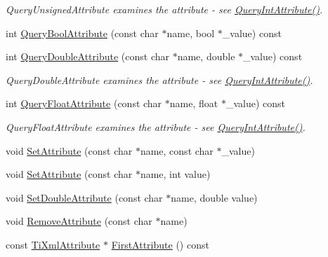 \begin{DoxyCompactItemize}
\begin{DoxyCompactList}\small\item\em \-Query\-Unsigned\-Attribute examines the attribute -\/ see \hyperlink{class_ti_xml_element_aea0bfe471380f281c5945770ddbf52b9}{\-Query\-Int\-Attribute()}. \end{DoxyCompactList}\item 
int \hyperlink{class_ti_xml_element_af4a1d3f88c28eb0f3115dc39ebd83fff}{\-Query\-Bool\-Attribute} (const char $\ast$name, bool $\ast$\-\_\-value) const 
\item 
\hypertarget{class_ti_xml_element_a898d7730ecc341f0bffc7a9dadbf1ce7}{int \hyperlink{class_ti_xml_element_a898d7730ecc341f0bffc7a9dadbf1ce7}{\-Query\-Double\-Attribute} (const char $\ast$name, double $\ast$\-\_\-value) const }\label{class_ti_xml_element_a898d7730ecc341f0bffc7a9dadbf1ce7}

\begin{DoxyCompactList}\small\item\em \-Query\-Double\-Attribute examines the attribute -\/ see \hyperlink{class_ti_xml_element_aea0bfe471380f281c5945770ddbf52b9}{\-Query\-Int\-Attribute()}. \end{DoxyCompactList}\item 
\hypertarget{class_ti_xml_element_aa04d3af11601ef5a5f88295203a843be}{int \hyperlink{class_ti_xml_element_aa04d3af11601ef5a5f88295203a843be}{\-Query\-Float\-Attribute} (const char $\ast$name, float $\ast$\-\_\-value) const }\label{class_ti_xml_element_aa04d3af11601ef5a5f88295203a843be}

\begin{DoxyCompactList}\small\item\em \-Query\-Float\-Attribute examines the attribute -\/ see \hyperlink{class_ti_xml_element_aea0bfe471380f281c5945770ddbf52b9}{\-Query\-Int\-Attribute()}. \end{DoxyCompactList}\item 
void \hyperlink{class_ti_xml_element_abf0b3bd7f0e4c746a89ec6e7f101fc32}{\-Set\-Attribute} (const char $\ast$name, const char $\ast$\-\_\-value)
\item 
void \hyperlink{class_ti_xml_element_ace6f4be75e373726d4774073d666d1a7}{\-Set\-Attribute} (const char $\ast$name, int value)
\item 
void \hyperlink{class_ti_xml_element_a0d1dd975d75496778177e35abfe0ec0b}{\-Set\-Double\-Attribute} (const char $\ast$name, double value)
\item 
void \hyperlink{class_ti_xml_element_a56979767deca794376b1dfa69a525b2a}{\-Remove\-Attribute} (const char $\ast$name)
\item 
\hypertarget{class_ti_xml_element_a516054c9073647d6cb29b6abe9fa0592}{const \hyperlink{class_ti_xml_attribute}{\-Ti\-Xml\-Attribute} $\ast$ \hyperlink{class_ti_xml_element_a516054c9073647d6cb29b6abe9fa0592}{\-First\-Attribute} () const }\label{class_ti_xml_element_a516054c9073647d6cb29b6abe9fa0592}


\end{DoxyCompactItemize}
